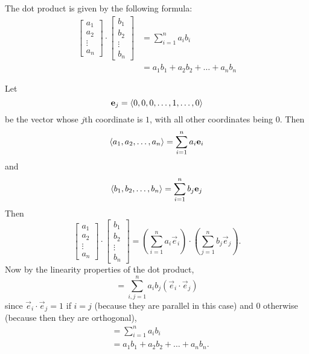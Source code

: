 \documentclass{ximera}
\begin{document}
\begin{theorem}
  The dot product is given by the following formula:
    \begin{align*}
  \begin{bmatrix}
    a_1\\
    a_2\\
    \vdots\\
    a_n
  \end{bmatrix}
  \cdot
  \begin{bmatrix}
    b_1\\
    b_2\\
    \vdots\\
    b_n
  \end{bmatrix}
  &= \sum_{i=1}^n a_ib_i\\
  &= a_1b_1 + a_2b_2 +\dots+a_nb_n
    \end{align*}
\begin{explanation}
  Let 
  \[
  \mathbf{e}_j = \left\langle 0,0,0,\dots,1,\dots,0\right\rangle
  \]	
  be the vector whose $j$th coordinate is $1$, with all other
  coordinates being $0$. Then
  \[ 
  \left\langle a_1,a_2, \dots,a_n\right\rangle = \sum_{i=1}^n a_i \mathbf{e}_i
  \]
  and
  \[ 
  \left\langle b_1,b_2, \dots,b_n\right\rangle = \sum_{i=1}^n b_j \mathbf{e}_j
  \]	 
    Then
    \[
    \begin{bmatrix}
      a_1\\
      a_2\\
      \vdots\\
      a_n
    \end{bmatrix}
    \cdot
    \begin{bmatrix}
      b_1\\
      b_2\\
      \vdots\\
      b_n
    \end{bmatrix} = \left(\sum_{i=1}^n a_i \vec{e}_i\right) \cdot \left(\sum_{j=1}^n b_j \vec{e}_j\right).
    \]
    Now by the linearity properties of the dot product,
    \[
    =\sum_{i,j =1}^n a_ib_j(\vec{e}_i \cdot \vec{e}_j)
    \]
    since $\vec{e}_i \cdot \vec{e}_j = 1$ if $i=j$ (because they are
    parallel in this case) and $0$ otherwise (because then they are
    orthogonal),
    \begin{align*}
    &=\sum_{i=1}^n a_ib_i \\
    &=a_1b_1 + a_2b_2 +\dots+a_nb_n.
    \end{align*}
\end{explanation}
\end{theorem}
\end{document}
